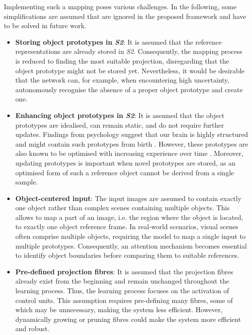 Implementing such a mapping poses various challenges.
In the following, some simplifications are assumed that are ignored in the proposed framework and have to be solved in future work.
\begin{itemize}
    \item \textbf{Storing object prototypes in \emph{S2}}: It is assumed that the reference representations are already stored in \emph{S2}. Consequently, the mapping process is reduced to finding the most suitable projection, disregarding that the object prototype might not be stored yet. Nevertheless, it would be desirable that the network can, for example, when encountering high uncertainty, autonomously recognise the absence of a proper object prototype and create one.
    \item \textbf{Enhancing object prototypes in \emph{S2}}: It is assumed that the object prototypes are idealised, can remain static, and do not require further updates. 
    Findings from psychology suggest that our brain is highly structured and might contain such prototypes from birth . However, these prototypes are also known to be optimised with increasing experience over time \cite{simion_face_2015}.
    Moreover, updating prototypes is important when novel prototypes are stored, as an optimised form of such a reference object cannot be derived from a single sample.
    \item \textbf{Object-centered input}: The input images are assumed to contain exactly one object rather than complex scenes containing multiple objects. This allows to map a part of an image, i.e. the region where the object is located, to exactly one object reference frame. In real-world scenarios, visual scenes often comprise multiple objects, requiring the model to map a single input to multiple prototypes. Consequently, an attention mechanism becomes essential to identify object boundaries before comparing them to suitable references.
    \item \textbf{Pre-defined projection fibres}: It is assumed that the projection fibres already exist from the beginning and remain unchanged throughout the learning process. Thus, the learning process focuses on the activation of control units. This assumption requires pre-defining many fibres, some of which may be unnecessary, making the system less efficient. However, dynamically growing or pruning fibres could make the system more efficient and robust.
\end{itemize}

